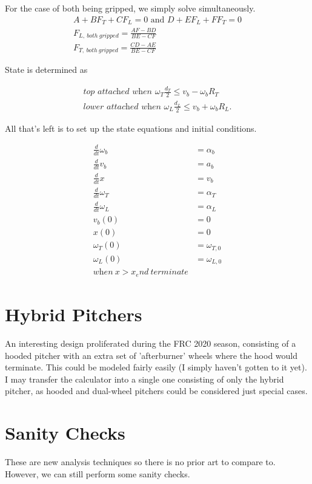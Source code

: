 \documentclass[10pt,letterpaper]{article}
\begin{document}
For the case of both being gripped, we simply solve simultaneously.
\begin{align}
	A + B F_T + C F_L = 0 \text{ and } D + E F_L + F F_T = 0 \nonumber \\
	F_{L,\ both\ gripped} = \frac{A F-B D}{B E-C F} \\
	F_{T,\ both\ gripped} = \frac{C D-A E}{B E-C F}
\end{align}

State is determined as

\begin{align}
	\textit{top attached when } \omega_{T} \frac{d_T}{2} \leq v_{b} - \omega_{b} R_T \\
	\textit{lower attached when } \omega_{L} \frac{d_L}{2} \leq v_{b} + \omega_{b} R_L .
\end{align}

	All that's left is to set up the state equations and initial conditions.

	\begin{align}
		\frac{d}{dt} \omega_b &= \alpha_b \\
		\frac{d}{dt} v_b &= a_b \\
		\frac{d}{dt} x &= v_b \\
		\frac{d}{dt} \omega_T &= \alpha_T \\
		\frac{d}{dt} \omega_L &= \alpha_L \\
		v_b(0) &= 0 \\
		x(0) &= 0 \\
		\omega_T(0) &= \omega_{T,0} \\
		\omega_L(0) &= \omega_{L,0} \\
		\textit{when} \ x > x_end \ \textit{terminate}
	\end{align}

\section*{Hybrid Pitchers}
An interesting design proliferated during the FRC 2020 season, consisting of a hooded pitcher with an extra set of 'afterburner' wheels where the hood would terminate. This could be modeled fairly easily (I simply haven't gotten to it yet). I may transfer the calculator into a single one consisting of only the hybrid pitcher, as hooded and dual-wheel pitchers could be considered just special cases.

\section*{Sanity Checks}
	These are new analysis techniques so there is no prior art to compare to. However, we can still perform some sanity checks.
\end{document}
